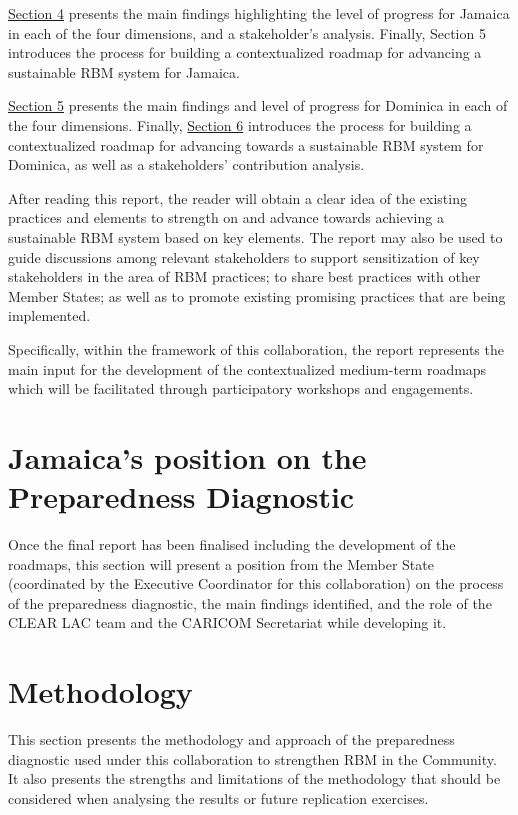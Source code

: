 \documentclass[
  10pt,
]{book}
\begin{document}
\protect\hyperlink{section4}{Section 4} presents the main findings highlighting the level of progress for Jamaica in each of the four dimensions, and a stakeholder's analysis. Finally, Section 5 introduces the process for building a contextualized roadmap for advancing a sustainable RBM system for Jamaica.

\protect\hyperlink{section5}{Section 5} presents the main findings and level of progress for Dominica in each of the four dimensions. Finally, \protect\hyperlink{section6}{Section 6} introduces the process for building a contextualized roadmap for advancing towards a sustainable RBM system for Dominica, as well as a stakeholders' contribution analysis.

After reading this report, the reader will obtain a clear idea of the existing practices and elements to strength on and advance towards achieving a sustainable RBM system based on key elements. The report may also be used to guide discussions among relevant stakeholders to support sensitization of key stakeholders in the area of RBM practices; to share best practices with other Member States; as well as to promote existing promising practices that are being implemented.

Specifically, within the framework of this collaboration, the report represents the main input for the development of the contextualized medium-term roadmaps which will be facilitated through participatory workshops and engagements.

\hypertarget{section2}{%
\chapter{Jamaica's position on the Preparedness Diagnostic}\label{section2}}

{ Once the final report has been finalised including the development of the roadmaps, this section will present a position from the Member State (coordinated by the Executive Coordinator for this collaboration) on the process of the preparedness diagnostic, the main findings identified, and the role of the CLEAR LAC team and the CARICOM Secretariat while developing it. }

\hypertarget{section3}{%
\chapter{Methodology}\label{section3}}

This section presents the methodology and approach of the preparedness diagnostic used under this collaboration to strengthen RBM in the Community. It also presents the strengths and limitations of the methodology that should be considered when analysing the results or future replication exercises.
\end{document}
